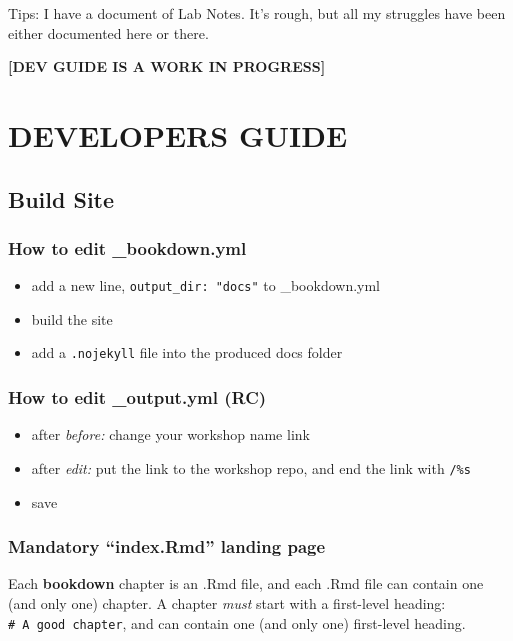 \documentclass[
]{book}
\providecommand{\tightlist}{%
  \setlength{\itemsep}{0pt}\setlength{\parskip}{0pt}}
\theoremstyle{definition}
\theoremstyle{definition}
\theoremstyle{definition}
\theoremstyle{definition}
\theoremstyle{remark}
\begin{document}
Tips: I have a document of Lab Notes. It's rough, but all my struggles have been either documented here or there.

\textbf{{[}DEV GUIDE IS A WORK IN PROGRESS{]}}

\part{DEVELOPERS GUIDE}\label{part-developers-guide}

\chapter{Build Site}\label{build-site}

\section{How to edit \_bookdown.yml}\label{how-to-edit-_bookdown.yml}

\begin{itemize}
\tightlist
\item
  add a new line, \texttt{output\_dir:\ "docs"} to \_bookdown.yml
\item
  build the site
\item
  add a \texttt{.nojekyll} file into the produced docs folder
\end{itemize}

\section{How to edit \_output.yml (RC)}\label{how-to-edit-_output.yml-rc}

\begin{itemize}
\tightlist
\item
  after \emph{before:} change your workshop name link
\item
  after \emph{edit:} put the link to the workshop repo, and end the link with \texttt{/\%s}
\item
  save
\end{itemize}

\section{Mandatory ``index.Rmd'' landing page}\label{mandatory-index.rmd-landing-page}

Each \textbf{bookdown} chapter is an .Rmd file, and each .Rmd file can contain one (and only one) chapter. A chapter \emph{must} start with a first-level heading: \texttt{\#\ A\ good\ chapter}, and can contain one (and only one) first-level heading.
\end{document}
